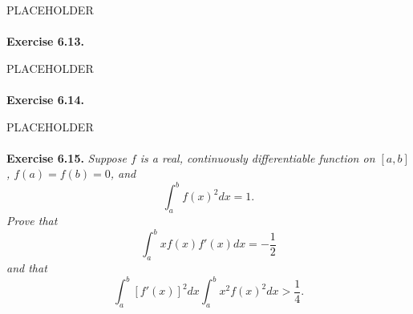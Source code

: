 \documentclass{article}
\begin{document}
PLACEHOLDER \\\\






\textbf{Exercise 6.13.}

PLACEHOLDER \\\\






\textbf{Exercise 6.14.}

PLACEHOLDER \\\\






\textbf{Exercise 6.15.}
\emph{Suppose $f$ is a real, continuously differentiable function on $[a,b]$,
$f(a)=f(b)=0$, and
\[
  \int_{a}^{b} f(x)^2 dx = 1.
\]
Prove that
\[
  \int_{a}^{b} xf(x)f'(x) dx = -\frac{1}{2}
\]
and that
\[
  \int_{a}^{b} [f'(x)]^2 dx \int_{a}^{b} x^2f(x)^2 dx > \frac{1}{4}.
\]
} \\
\end{document}
